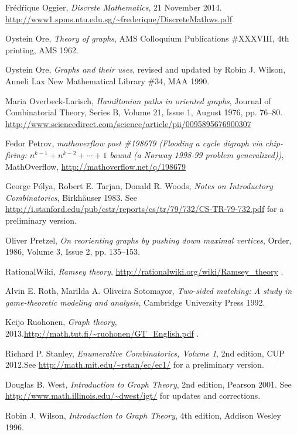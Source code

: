 \documentclass[numbers=enddot,12pt,final,onecolumn,notitlepage]{scrartcl}%
\theoremstyle{definition}
\begin{document}
\begin{thebibliography}{9999999999}
Fr\'ed\'rique Oggier,
\textit{Discrete Mathematics},
21 November 2014.
\newline\url{http://www1.spms.ntu.edu.sg/~frederique/DiscreteMathws.pdf}

Oystein Ore, \textit{Theory of graphs},
AMS Colloquium Publications \#XXXVIII,
4th printing, AMS 1962.

Oystein Ore, \textit{Graphs and their uses}, revised and updated by
Robin J. Wilson,
Anneli Lax New Mathematical Library \#34, MAA 1990.

Maria Overbeck-Larisch,
\textit{Hamiltonian paths in oriented graphs},
Journal of Combinatorial Theory, Series B,
Volume 21, Issue 1, August 1976, pp. 76--80.
\newline \url{http://www.sciencedirect.com/science/article/pii/0095895676900307}

Fedor Petrov,
\textit{mathoverflow post \#198679 (Flooding a cycle digraph via
chip-firing: $n^{k-1} + n^{k-2} + \cdots + 1$ bound (a Norway 1998-99
problem generalized))},
MathOverflow,
\newline \url{http://mathoverflow.net/q/198679}

George P\'olya, Robert E. Tarjan,
Donald R. Woods,
\textit{Notes on Introductory Combinatorics},
Birkh\"auser 1983.
\newline See
\url{http://i.stanford.edu/pub/cstr/reports/cs/tr/79/732/CS-TR-79-732.pdf}
for a preliminary version.

Oliver Pretzel,
\textit{On reorienting graphs by pushing down maximal vertices},
Order, 1986, Volume 3, Issue 2, pp. 135--153.

RationalWiki,
\textit{Ramsey theory},
\url{http://rationalwiki.org/wiki/Ramsey_theory} .

Alvin E. Roth, Marilda A. Oliveira
Sotomayor, \textit{Two-sided matching: A study in game-theoretic
modeling and analysis}, Cambridge University Press 1992.

Keijo Ruohonen, \textit{Graph theory},
2013.\newline \url{http://math.tut.fi/~ruohonen/GT_English.pdf} .

Richard P. Stanley, \textit{Enumerative
Combinatorics, Volume 1}, 2nd edition, CUP 2012.\newline See
\url{http://math.mit.edu/~rstan/ec/ec1/} for a preliminary version.

Douglas B. West,
\textit{Introduction to Graph Theory}, 2nd edition, Pearson 2001.
\newline See \url{http://www.math.illinois.edu/~dwest/igt/}
for updates and corrections.

Robin J. Wilson,
\textit{Introduction to Graph Theory}, 4th edition,
Addison Wesley 1996.

\end{thebibliography}
\end{document}
